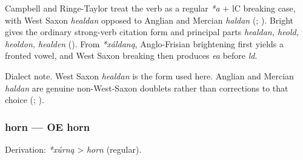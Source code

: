 \documentclass[
  british,
  a4paper,
]{article}
\begin{document}
Campbell and Ringe-Taylor treat the verb as a regular \emph{*a} + lC
breaking case, with West Saxon \emph{healdan} opposed to Anglian and
Mercian \emph{haldan} (; ).
Bright gives the ordinary strong-verb citation form and principal parts
\emph{healdan, heold, heoldon, healden}
(). From
\emph{*xáldaną}, Anglo-Frisian brightening first yields a fronted vowel,
and West Saxon breaking then produces \emph{ea} before \emph{ld}.

Dialect note. West Saxon \emph{healdan} is the form used here. Anglian
and Mercian \emph{haldan} are genuine non-West-Saxon doublets rather
than corrections to that choice (; ).

\subsubsection{horn --- OE horn}\label{horn-oe-horn}

Derivation: \emph{*xúrną} \textgreater{} \emph{horn} (regular).

\begingroup
\setlength{\fboxsep}{6pt}
\end{document}

